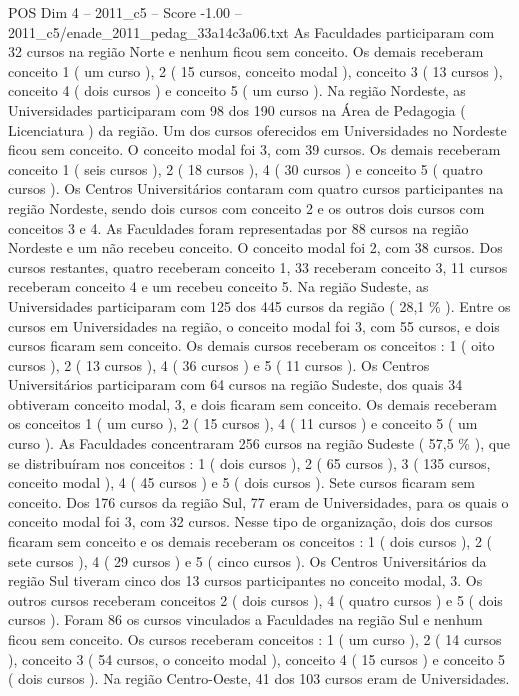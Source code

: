 \begin{textsample}{POS Dim 4 – 2011\_c5 – Score -1.00 – 2011\_c5/enade\_2011\_pedag\_33a14c3a06.txt}
As Faculdades participaram com 32 cursos na região Norte e nenhum ficou sem conceito.
Os demais receberam conceito 1 ( um curso ), 2 ( 15 cursos, conceito modal ), conceito 3 ( 13 cursos ), conceito 4 ( dois cursos ) e conceito 5 ( um curso ).
Na região Nordeste, as Universidades participaram com 98 dos 190 cursos na Área de Pedagogia ( Licenciatura ) da região.
Um dos cursos oferecidos em Universidades no Nordeste ficou sem conceito.
O conceito modal foi 3, com 39 cursos.
Os demais receberam conceito 1 ( seis cursos ), 2 ( 18 cursos ), 4 ( 30 cursos ) e conceito 5 ( quatro cursos ).
Os Centros Universitários contaram com quatro cursos participantes na região Nordeste, sendo dois cursos com conceito 2 e os outros dois cursos com conceitos 3 e 4.
As Faculdades foram representadas por 88 cursos na região Nordeste e um não recebeu conceito.
O conceito modal foi 2, com 38 cursos.
Dos cursos restantes, quatro receberam conceito 1, 33 receberam conceito 3, 11 cursos receberam conceito 4 e um recebeu conceito 5.
Na região Sudeste, as Universidades participaram com 125 dos 445 cursos da região ( 28,1 \% ).
Entre os cursos em Universidades na região, o conceito modal foi 3, com 55 cursos, e dois cursos ficaram sem conceito.
Os demais cursos receberam os conceitos : 1 ( oito cursos ), 2 ( 13 cursos ), 4 ( 36 cursos ) e 5 ( 11 cursos ).
Os Centros Universitários participaram com 64 cursos na região Sudeste, dos quais 34 obtiveram conceito modal, 3, e dois ficaram sem conceito.
Os demais receberam os conceitos 1 ( um curso ), 2 ( 15 cursos ), 4 ( 11 cursos ) e conceito 5 ( um curso ).
As Faculdades concentraram 256 cursos na região Sudeste ( 57,5 \% ), que se distribuíram nos conceitos : 1 ( dois cursos ), 2 ( 65 cursos ), 3 ( 135 cursos, conceito modal ), 4 ( 45 cursos ) e 5 ( dois cursos ).
Sete cursos ficaram sem conceito.
Dos 176 cursos da região Sul, 77 eram de Universidades, para os quais o conceito modal foi 3, com 32 cursos.
Nesse tipo de organização, dois dos cursos ficaram sem conceito e os demais receberam os conceitos : 1 ( dois cursos ), 2 ( sete cursos ), 4 ( 29 cursos ) e 5 ( cinco cursos ).
Os Centros Universitários da região Sul tiveram cinco dos 13 cursos participantes no conceito modal, 3.
Os outros cursos receberam conceitos 2 ( dois cursos ), 4 ( quatro cursos ) e 5 ( dois cursos ).
Foram 86 os cursos vinculados a Faculdades na região Sul e nenhum ficou sem conceito.
Os cursos receberam conceitos : 1 ( um curso ), 2 ( 14 cursos ), conceito 3 ( 54 cursos, o conceito modal ), conceito 4 ( 15 cursos ) e conceito 5 ( dois cursos ).
Na região Centro-Oeste, 41 dos 103 cursos eram de Universidades.

\end{textsample}
